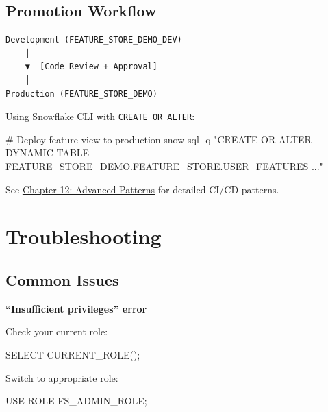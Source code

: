 \documentclass[
  letterpaper,
  DIV=11,
  numbers=noendperiod]{scrreprt}
\newenvironment{Shaded}{\begin{snugshade}}{\end{snugshade}}
\newcommand{\AttributeTok}[1]{\textcolor[rgb]{0.40,0.45,0.13}{#1}}
\newcommand{\CommentTok}[1]{\textcolor[rgb]{0.37,0.37,0.37}{#1}}
\newcommand{\ExtensionTok}[1]{\textcolor[rgb]{0.00,0.23,0.31}{#1}}
\newcommand{\KeywordTok}[1]{\textcolor[rgb]{0.00,0.23,0.31}{#1}}
\newcommand{\NormalTok}[1]{\textcolor[rgb]{0.00,0.23,0.31}{#1}}
\newcommand{\StringTok}[1]{\textcolor[rgb]{0.13,0.47,0.30}{#1}}
\begin{document}
\hypertarget{promotion-workflow-1}{%
\subsection{Promotion Workflow}\label{promotion-workflow-1}}

\begin{verbatim}
Development (FEATURE_STORE_DEMO_DEV)
    │
    ▼  [Code Review + Approval]
    │
Production (FEATURE_STORE_DEMO)
\end{verbatim}

Using Snowflake CLI with \texttt{CREATE\ OR\ ALTER}:

\begin{Shaded}
\begin{Highlighting}[]
\CommentTok{\# Deploy feature view to production}
\ExtensionTok{snow}\NormalTok{ sql }\AttributeTok{{-}q} \StringTok{"CREATE OR ALTER DYNAMIC TABLE FEATURE\_STORE\_DEMO.FEATURE\_STORE.USER\_FEATURES ..."}
\end{Highlighting}
\end{Shaded}

See \protect\hyperlink{advanced-patterns}{Chapter 12: Advanced Patterns}
for detailed CI/CD patterns.

\hypertarget{troubleshooting-1}{%
\section{Troubleshooting}\label{troubleshooting-1}}

\hypertarget{common-issues}{%
\subsection{Common Issues}\label{common-issues}}

\textbf{``Insufficient privileges'' error}

Check your current role:

\begin{Shaded}
\begin{Highlighting}[]
\KeywordTok{SELECT}\NormalTok{ CURRENT\_ROLE();}
\end{Highlighting}
\end{Shaded}

Switch to appropriate role:

\begin{Shaded}
\begin{Highlighting}[]
\KeywordTok{USE} \KeywordTok{ROLE}\NormalTok{ FS\_ADMIN\_ROLE;}
\end{Highlighting}
\end{Shaded}
\end{document}

